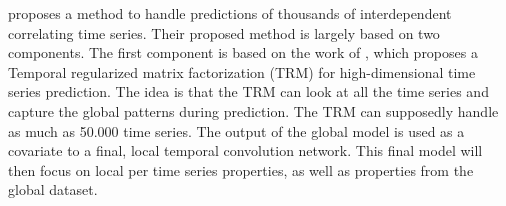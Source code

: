 \cite{Sen2019} proposes a method to handle predictions of thousands of interdependent correlating time series.
Their proposed method is largely based on two components. The first component is based on the work of
\cite{Yu}, which proposes a Temporal regularized matrix factorization (TRM) for high-dimensional time series prediction.
The idea is that the TRM can look at all the time series and capture the global patterns during prediction.
The TRM can supposedly handle as much as 50.000 time series.
The output of the global model is used as a covariate to a final, local temporal convolution network. This final model
will then focus on local per time series properties, as well as properties from the global dataset.





%

